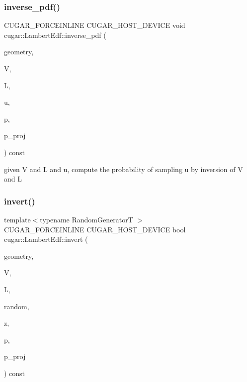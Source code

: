 \subsubsection{\texorpdfstring{inverse\+\_\+pdf()}{inverse\_pdf()}}
{\footnotesize\ttfamily C\+U\+G\+A\+R\+\_\+\+F\+O\+R\+C\+E\+I\+N\+L\+I\+NE C\+U\+G\+A\+R\+\_\+\+H\+O\+S\+T\+\_\+\+D\+E\+V\+I\+CE void cugar\+::\+Lambert\+Edf\+::inverse\+\_\+pdf (\begin{DoxyParamCaption}\item[{const \hyperlink{structcugar_1_1_differential_geometry}{Differential\+Geometry} \&}]{geometry,  }\item[{const \hyperlink{structcugar_1_1_vector}{Vector3f}}]{V,  }\item[{const \hyperlink{structcugar_1_1_vector}{Vector3f}}]{L,  }\item[{const \hyperlink{structcugar_1_1_vector}{Vector3f}}]{u,  }\item[{float \&}]{p,  }\item[{float \&}]{p\+\_\+proj }\end{DoxyParamCaption}) const\hspace{0.3cm}{\ttfamily [inline]}}

given V and L and u, compute the probability of sampling u by inversion of V and L \mbox{\label{structcugar_1_1_lambert_edf_ae3d6b75902074a76f918a8d8d2bba24e}} 
\subsubsection{\texorpdfstring{invert()}{invert()}}
{\footnotesize\ttfamily template$<$typename Random\+GeneratorT $>$ \\
C\+U\+G\+A\+R\+\_\+\+F\+O\+R\+C\+E\+I\+N\+L\+I\+NE C\+U\+G\+A\+R\+\_\+\+H\+O\+S\+T\+\_\+\+D\+E\+V\+I\+CE bool cugar\+::\+Lambert\+Edf\+::invert (\begin{DoxyParamCaption}\item[{const \hyperlink{structcugar_1_1_differential_geometry}{Differential\+Geometry} \&}]{geometry,  }\item[{const \hyperlink{structcugar_1_1_vector}{Vector3f}}]{V,  }\item[{const \hyperlink{structcugar_1_1_vector}{Vector3f}}]{L,  }\item[{Random\+GeneratorT \&}]{random,  }\item[{\hyperlink{structcugar_1_1_vector}{Vector3f} \&}]{z,  }\item[{float \&}]{p,  }\item[{float \&}]{p\+\_\+proj }\end{DoxyParamCaption}) const\hspace{0.3cm}{\ttfamily [inline]}}

